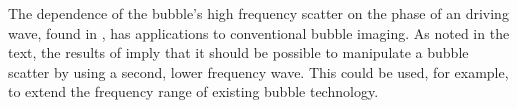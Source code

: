 The dependence of the bubble's high frequency scatter on the phase of an  driving wave, found in ,
has applications to conventional bubble imaging.
As noted in the text, 
the results of  imply that it should be possible to manipulate a bubble scatter by using a second, lower frequency wave.
This could be used, for example, 
to extend the frequency range of existing bubble technology.









